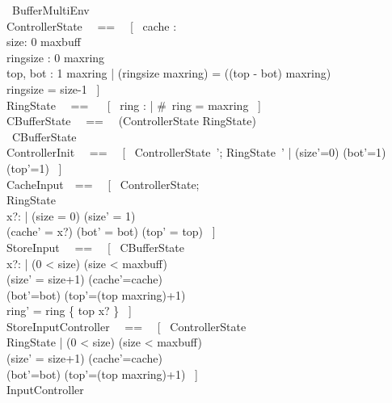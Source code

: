 \begin{circus}
    \circprocess\ BufferMultiEnv \circdef \circbegin \\
    ControllerState ~~==~~ [~ cache : \nat
        \\%
        size: 0 \upto maxbuff
        \\%
        ringsize : 0 \upto maxring
        \\%
        top, bot : 1 \upto maxring
        |
        (ringsize \mod maxring) = ((top - bot) \mod maxring)
        \\%
        ringsize = size-1
        ~] \\
    RingState ~~== ~~ [~ ring : \seq \nat | \#~ring = maxring ~] \\
    CBufferState ~~==~~ (ControllerState \lor RingState) \\
    \circstate\  CBufferState \\
    ControllerInit ~~==~~ [~ ControllerState~'; RingState~' | (size'=0) \land (bot'=1) \land (top'=1) ~] \\
    CacheInput~~==~~ [~ \Delta ControllerState;
        \\%
        \Xi RingState
        \\%
        x?:\nat
        |
        (size = 0) \land (size' = 1)
        \\%
        (cache' = x?) \land (bot' = bot) \land (top' = top) ~]\\
    StoreInput ~~==~~ [~ \Delta CBufferState
        \\%
        x?: \nat
        |
        (0 < size) \land (size < maxbuff)
        \\%
        (size' = size+1) \land (cache'=cache)
        \\%
        (bot'=bot) \land (top'=(top \mod maxring)+1)
        \\%
        ring' = ring \oplus \{ top \mapsto x? \} ~] \\
    StoreInputController ~~==~~ [~ \Delta ControllerState
        \\%
        \Xi RingState
        |
        (0 < size) \land (size < maxbuff)
        \\%
        (size' = size+1) \land (cache'=cache)
        \\%
        (bot'=bot) \land (top'=(top \mod maxring)+1) ~] \\
    InputController ~~\circdef~~ \\


\end{circus}
